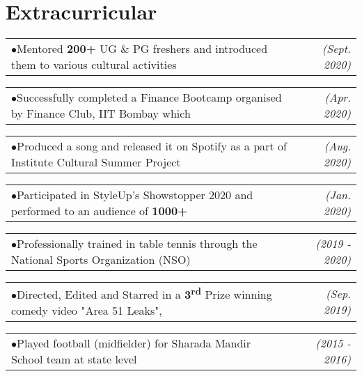 \documentclass[a4paper,11pt]{article}
\makeatletter
\newcommand{\extracurr}[2]{
    \begin{tabular*}{0.977\textwidth}{l@{\extracolsep{\fill}}r}
        \tiny{$\bullet$}\hspace{7pt}\small{#1} & \textit{\small{#2}} \\
    \end{tabular*}\vspace{-11pt}
}
\makeatother
\begin{document}
  \section{Extracurricular}
    \begin{adjustwidth}{10.8pt}{}
      \extracurr{Mentored \textbf{200+} UG \& PG freshers and introduced them to various cultural activities}{(Sept. 2020)}
      
      \extracurr{Successfully completed a Finance Bootcamp organised by Finance Club, IIT Bombay which}{(Apr. 2020)}
      
      \vspace{-2pt} \hspace{3.75mm}{\small taught and tested the knowledge of Financial Statements, Capital Markets \& Ratio Analysis}
      
      \vspace{2pt}
      \extracurr{Produced a song and released it on Spotify as a part of Institute Cultural Summer Project}{(Aug. 2020)}
      
      \extracurr{Participated in StyleUp's Showstopper 2020 and performed to an audience of \textbf{1000+}}{(Jan. 2020)}
      
      \extracurr{Professionally trained in table tennis through the National Sports Organization (NSO)} {(2019 - 2020)}
      
      \extracurr{Directed, Edited and Starred in a \textbf{3\textsuperscript{rd}} Prize winning comedy video "Area 51 Leaks",}{(Sep. 2019)}
      
      \vspace{-2pt} \hspace{3.75mm}{made as an entry for the freshmen festival (Freshiezza)}
      
      \vspace{2pt}
      \extracurr{Played football (midfielder) for Sharada Mandir School team at state level}{(2015 - 2016)}
    
    \end{adjustwidth}
    
\end{document}
